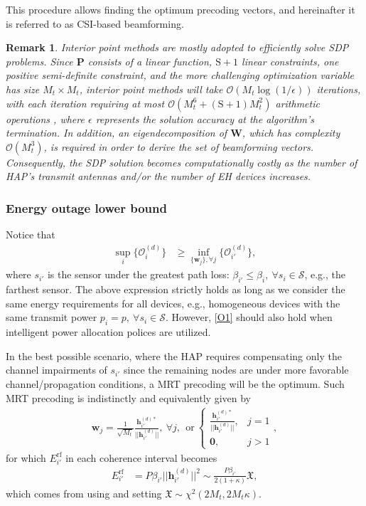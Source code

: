 \documentclass[10pt,journal,a4paper]{IEEEtran}
\newtheorem{remark}{Remark}
\begin{document}
	This procedure allows finding the optimum precoding vectors, and hereinafter it is referred to as CSI-based beamforming.
	\begin{remark}	\label{re2}	
	Interior point methods are mostly adopted to efficiently solve SDP problems. Since $\mathbf{P}$ consists of a linear function, $\mathrm{S}+1$ linear
	constraints, one positive semi-definite constraint, and the more challenging optimization variable has size $M_t \times M_t$, interior point methods will take $\mathcal{O}(M_t \log(1/\epsilon))$ iterations, with each iteration requiring at most $\mathcal{O}(M_t^6 + (\mathrm{S} + 1)M_t^2)$ arithmetic operations \cite{Ye.2011}, where $\epsilon$ represents the solution accuracy
	at the algorithm's termination. In addition, an eigendecomposition of $\mathbf{W}$, which has complexity $\mathcal{O}(M_t^3)$, is required in order to derive the set of beamforming vectors. Consequently, the
	SDP solution becomes computationally costly as the number of HAP's transmit antennas and/or the number of EH devices increases.
    \end{remark}
	\subsubsection{Energy outage lower bound}
	Notice that
	\begin{align}
	\sup_i\{\mathcal{O}_i^{(d)}\}&\ge \inf_{\{\mathbf{w}_j\},\forall j}\{\mathcal{O}_{i'}^{(d)}\},\label{O1}
	\end{align}
	where $s_{i'}$ is the sensor under the greatest path loss: $\beta_{i'}\!\le\! \beta_i,\ \forall s_i\in \mathcal{S}$, e.g., the farthest sensor. The above expression strictly holds  as long as we consider the same energy requirements for all devices, e.g., homogeneous devices with the same  transmit power $p_i=p,\ \forall s_i\in \mathcal{S}$. However, \eqref{O1} should also hold when intelligent power allocation polices are utilized.
	
	In the best possible scenario, where the HAP requires compensating only the channel impairments of $s_{i'}$ since the remaining nodes are under more favorable channel/propagation conditions, a MRT precoding will be the optimum. Such MRT precoding is indistinctly and equivalently given  by
	\begin{align}
	\mathbf{w}_j=\frac{1}{\sqrt{M_t}}\frac{\mathbf{h}_{i'}^{(d)*}}{||\mathbf{h}_{i'}^{(d)}||},\ \forall j,\ \ \mathrm{or}\
	\left\{\begin{array}{ll}
	\frac{\mathbf{h}_{i'}^{(d)*}}{||\mathbf{h}_{i'}^{(d)}||},& j=1\\
	\bm{0}, & j>1
	\end{array}\right.,\label{wj}
	\end{align} 
	for which $E_{i'}^\mathrm{rf}$ in each coherence interval becomes
	\begin{align}
	E_{i'}^\mathrm{rf}&=P\beta_{i'}||\mathbf{h}_{i'}^{(d)}||^2\sim \frac{P\beta_{i'}}{2(1+\kappa)}\mathfrak{X},\label{Ei'} 
	\end{align}
	which comes from using \cite[Eq.~(45)]{Lopez.2019_CSI} and setting $\mathfrak{X}\sim \chi^2(2M_t,2M_t\kappa)$.
	
\end{document}
